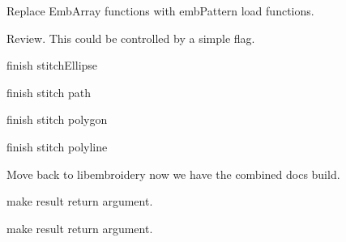 \begin{DoxyRefList}
\label{todo__todo000224}%
%
Replace Emb\+Array functions with emb\+Pattern load functions. 
\item[Member \mbox{\hyperlink{geometry_8c_ae6461f57f08ce5992c70fa9897988644}{emb\+Geometry\+\_\+vulcanize}} (Emb\+Geometry $\ast$obj)]\label{todo__todo000249}%
%
Review. This could be controlled by a simple flag.  
\item[Member \mbox{\hyperlink{fill_8c_a63bc84e4406e59c092a2e076afedf930}{emb\+Pattern\+\_\+stitch\+Ellipse}} (Emb\+Pattern $\ast$p, Emb\+Ellipse ellipse, int thread\+\_\+index, int style)]\label{todo__todo000235}%
%
finish stitch\+Ellipse  
\item[Member \mbox{\hyperlink{fill_8c_a736fce5df010bbe74ea9ad2857be9bf4}{emb\+Pattern\+\_\+stitch\+Path}} (Emb\+Pattern $\ast$p, Emb\+Path path, int thread\+\_\+index, int style)]\label{todo__todo000236}%
%
finish stitch path  
\item[Member \mbox{\hyperlink{fill_8c_a86f903495c0da7514294200680bd6414}{emb\+Pattern\+\_\+stitch\+Polygon}} (Emb\+Pattern $\ast$p, Emb\+Polygon polygon, int thread\+\_\+index, int style)]\label{todo__todo000237}%
%
finish stitch polygon  
\item[Member \mbox{\hyperlink{fill_8c_a9ae9d5d7dfbb2ab361dc37970b7eb2f2}{emb\+Pattern\+\_\+stitch\+Polyline}} (Emb\+Pattern $\ast$p, Emb\+Polyline polyline, int thread\+\_\+index, int style)]\label{todo__todo000238}%
%
finish stitch polyline  
\item[Page \mbox{\hyperlink{md_extern_libembroidery_src_embroider_cli}{embroider\+\_\+cli}} ]\label{todo__todo000227}%
%
Move back to libembroidery now we have the combined docs build. 
\item[Member \mbox{\hyperlink{vector_8c_a0a4af07bfac410623cf77a35a11550b1}{emb\+Vector\+\_\+multiply}} (Emb\+Vector vector, Emb\+Real magnitude, Emb\+Vector $\ast$result)]\label{todo__todo000260}%
%
make result return argument.  
\item[Member \mbox{\hyperlink{vector_8c_aaad72d90c58592e330de08139aee5077}{emb\+Vector\+\_\+normalize}} (Emb\+Vector vector, Emb\+Vector $\ast$result)]\label{todo__todo000259}%
%
make result return argument.  
\item[Member \mbox{\hyperlink{imgui__main_8c_a9c4cd1539d25f519a7e56f9df93761c2}{enable\+Move\+Rapid\+Fire}} (void)]\label{todo__todo000039}%

\end{DoxyRefList}
